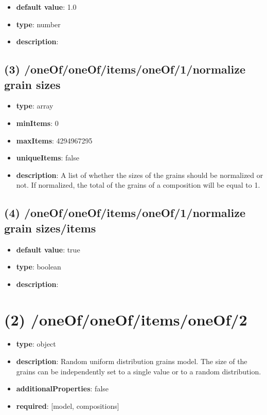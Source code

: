 \begin{itemize}[leftmargin=4em]\item {\bf default value}: 1.0
\item {\bf type}: number
\item {\bf description}: 
\end{itemize}\subsection{(3) /oneOf/oneOf/items/oneOf/1/normalize grain sizes}
\begin{itemize}[leftmargin=3em]\item {\bf type}: array
\item {\bf minItems}: 0
\item {\bf maxItems}: 4294967295
\item {\bf uniqueItems}: false
\item {\bf description}: A list of whether the sizes of the grains should be normalized or not. If normalized, the total of the grains of a composition will be equal to 1.
\end{itemize}\subsection{(4) /oneOf/oneOf/items/oneOf/1/normalize grain sizes/items}
\begin{itemize}[leftmargin=4em]\item {\bf default value}: true
\item {\bf type}: boolean
\item {\bf description}: 
\end{itemize}\section{(2) /oneOf/oneOf/items/oneOf/2}
\begin{itemize}[leftmargin=2em]\item {\bf type}: object
\item {\bf description}: Random uniform distribution grains model. The size of the grains can be independently set to a single value or to a random distribution.
\item {\bf additionalProperties}: false
\item {\bf required}: [model, compositions]\end{itemize}

